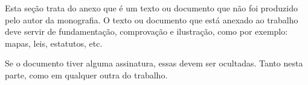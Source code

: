 Esta seção trata do anexo que é um texto ou documento que não foi produzido
pelo autor da monografia. O texto ou documento que está anexado ao trabalho
deve servir de fundamentação, comprovação e ilustração, como por exemplo:
mapas, leis, estatutos, etc.

Se o documento tiver alguma assinatura, essas devem ser ocultadas. Tanto nesta
parte, como em qualquer outra do trabalho.
